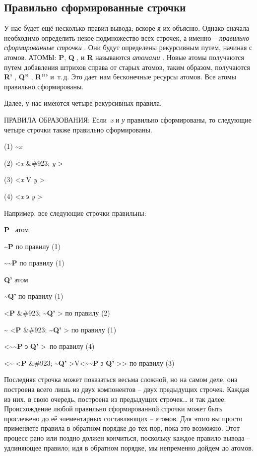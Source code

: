 \documentclass[../main.tex]{subfiles}
\begin{document}
\subsection{Правильно сформированные строчки}

У нас будет ещё несколько правил вывода; вскоре я их объясню. Однако сначала необходимо определить некое подмножество всех строчек, а именно \--- \emph{правильно сформированные строчки} . Они будут определены рекурсивным путем, начиная с атомов. АТОМЫ: \textbf{P}, \textbf{Q} , и \textbf{R} называются \emph{атомами} . Новые атомы получаются путем добавления штрихов справа от старых атомов, таким образом, получаются \textbf{R'} , \textbf{Q''} , \textbf{R'''} и~т.\,д. Это дает нам бесконечные ресурсы атомов. Все атомы правильно сформированы.

Далее, у нас имеются четыре рекурсивных правила.

ПРАВИЛА ОБРАЗОВАНИЯ: Если~\emph{x} и \emph{у} правильно сформированы, то следующие четыре строчки также правильно сформированы.

(1) \textasciitilde{}\emph{x}

(2) \textless{}\emph{x} \&\#923; \emph{y} \textgreater{}

(3) \textless{}\emph{x} V \emph{y} \textgreater{}

(4) \textless{}\emph{x} э \emph{y} \textgreater{}

Например, все следующие строчки правильны:

\textbf{P} ~атом

\textbf{\textasciitilde P} по правилу (1)

\textbf{\textasciitilde\textasciitilde P} по правилу (1)

\textbf{Q'} атом

\textbf{\textasciitilde Q'} по правилу (1)

\textless{}\textbf{P} \&\#923; \textbf{\textasciitilde Q'} \textgreater{} по правилу (2)

\textbf{\textasciitilde{}} \textless{}\textbf{P} \&\#923; \textbf{\textasciitilde Q'} \textgreater{} по правилу (1)

\textless{}\textbf{\textasciitilde\textasciitilde P} э \textbf{Q'} \textgreater~по правилу (4)

\textless{}\textbf{\textasciitilde{}} \textless{}\textbf{P} \&\#923; \textbf{\textasciitilde Q'} \textgreater V\textless{}\textbf{\textasciitilde\textasciitilde P} э \textbf{Q'} \textgreater\textgreater{} по правилу (3)

Последняя строчка может показаться весьма сложной, но на самом деле, она построена всего лишь из двух компонентов \--- двух предыдущих строчек. Каждая из них, в свою очередь, построена из предыдущих строчек\ldots{} и так далее. Происхождение любой правильно сформированной строчки может быть прослежено до её элементарных составляющих \--- атомов. Для этого вы просто применяете правила в обратном порядке до тех пор, пока это возможно. Этот процесс рано или поздно должен кончиться, поскольку каждое правило вывода \--- удлиняющее правило; идя в обратном порядке, мы непременно дойдем до атомов.
\end{document}
